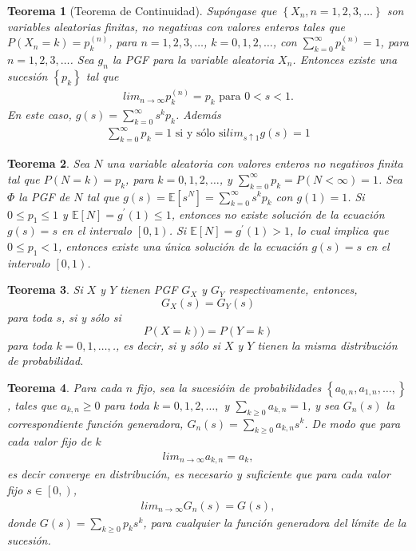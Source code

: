 \documentclass{article}
\newtheorem{Teo}{Teorema}[section]
\newcommand{\esp}{\mathbb{E}}
\numberwithin{equation}{section}
\begin{document}
\begin{Teo}[Teorema de Continuidad]
Sup\'ongase que $\left\{X_{n},n=1,2,3,\ldots\right\}$ son variables aleatorias finitas, no negativas con valores enteros tales que $P\left(X_{n}=k\right)=p_{k}^{(n)}$, para $n=1,2,3,\ldots$, $k=0,1,2,\ldots$, con $\sum_{k=0}^{\infty}p_{k}^{(n)}=1$, para $n=1,2,3,\ldots$. Sea $g_{n}$ la PGF para la variable aleatoria $X_{n}$. Entonces existe una sucesi\'on $\left\{p_{k}\right\}$ tal que \begin{eqnarray*}
lim_{n\rightarrow\infty}p_{k}^{(n)}=p_{k}\textrm{ para }0<s<1.
\end{eqnarray*}
En este caso, $g\left(s\right)=\sum_{k=0}^{\infty}s^{k}p_{k}$. Adem\'as
\begin{eqnarray*}
\sum_{k=0}^{\infty}p_{k}=1\textrm{ si y s\'olo si
}lim_{s\uparrow1}g\left(s\right)=1
\end{eqnarray*}
\end{Teo}

\begin{Teo}
Sea $N$ una variable aleatoria con valores enteros no negativos finita tal que $P\left(N=k\right)=p_{k}$, para $k=0,1,2,\ldots$, y $\sum_{k=0}^{\infty}p_{k}=P\left(N<\infty\right)=1$. Sea $\Phi$ la PGF de $N$ tal que $g\left(s\right)=\esp\left[s^{N}\right]=\sum_{k=0}^{\infty}s^{k}p_{k}$ con $g\left(1\right)=1$. Si $0\leq p_{1}\leq1$ y $\esp\left[N\right]=g^{'}\left(1\right)\leq1$, entonces no existe soluci\'on  de la ecuaci\'on $g\left(s\right)=s$ en el intervalo $\left[0,1\right)$. Si $\esp\left[N\right]=g^{'}\left(1\right)>1$, lo cual implica que $0\leq p_{1}<1$, entonces existe una \'unica soluci\'on de la ecuaci\'on $g\left(s\right)=s$ en el intervalo
$\left[0,1\right)$.
\end{Teo}

\begin{Teo}
Si $X$ y $Y$ tienen PGF $G_{X}$ y $G_{Y}$ respectivamente, entonces,\[G_{X}\left(s\right)=G_{Y}\left(s\right)\] para toda $s$, si y s\'olo si \[P\left(X=k\right))=P\left(Y=k\right)\] para toda $k=0,1,\ldots,$., es decir, si y s\'olo si $X$ y $Y$ tienen la misma distribuci\'on de probabilidad.
\end{Teo}


\begin{Teo}
Para cada $n$ fijo, sea la sucesi\'oin de probabilidades $\left\{a_{0,n},a_{1,n},\ldots,\right\}$, tales que $a_{k,n}\geq0$ para toda $k=0,1,2,\ldots,$ y $\sum_{k\geq0}a_{k,n}=1$, y sea $G_{n}\left(s\right)$ la correspondiente funci\'on generadora, $G_{n}\left(s\right)=\sum_{k\geq0}a_{k,n}s^{k}$. De modo que para cada valor fijo de $k$
\begin{eqnarray*}
lim_{n\rightarrow\infty}a_{k,n}=a_{k},
\end{eqnarray*}
es decir converge en distribuci\'on, es necesario y suficiente que para cada valor fijo $s\in\left[0,\right)$,
\begin{eqnarray*}
lim_{n\rightarrow\infty}G_{n}\left(s\right)=G\left(s\right),
\end{eqnarray*}
donde $G\left(s\right)=\sum_{k\geq0}p_{k}s^{k}$, para cualquier la funci\'on generadora del l\'imite de la sucesi\'on.
\end{Teo}
\end{document}
